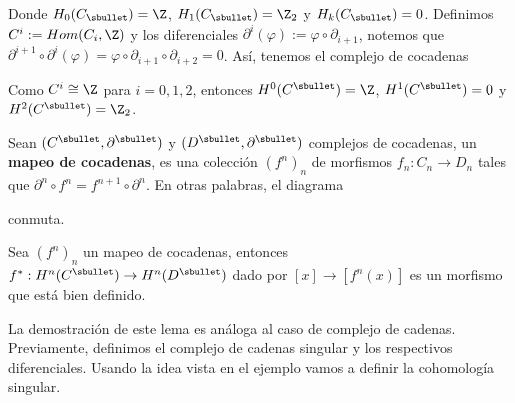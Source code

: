 \documentclass{article}
\begin{document}
\vspace{2mm}
\noindent Donde $H_{0}(C_{\sbullet})=\Z$, $H_{1}(C_{\sbullet})=\Z_{2}$ y $H_{k}(C_{\sbullet})=0$. 
Definimos $C^{i}:=Hom(C_{i},\Z)$ y los diferenciales $\partial^{i}(\varphi)
:=\varphi\circ\partial_{i+1}$, notemos que $\partial^{i+1}\circ\partial^{i}(\varphi)
=\varphi\circ\partial_{i+1}\circ\partial_{i+2}=0$. Así, tenemos el complejo de cocadenas

\vspace{2mm}
    \centerline{
    }

\vspace{2mm}
\noindent Como $C^{i}\cong\Z$ para $i=0,1,2$, entonces $H^{0}(C^{\sbullet})=\Z$, 
$H^{1}(C^{\sbullet})=0$ y $H^{2}(C^{\sbullet})=\Z_{2}$.

\vspace{2mm}
\begin{dfn}
    Sean $(C^{\sbullet},\partial^{\sbullet})$ y $(D^{\sbullet},\partial^{\sbullet})$ complejos de
    cocadenas, un \textbf{mapeo de cocadenas}, es una colección $(f^{n})_{n}$ de morfismos
    $f_{n}:C_{n}\to D_{n}$ tales que $\partial^{n}\circ f^{n}=f^{n+1}\circ\partial^{n}$. En otras
    palabras, el diagrama

    \vspace{2mm}
    \centerline{
    }
    \noindent conmuta.
\end{dfn}

\begin{lema}
    Sea $(f^{n})_{n}$ un mapeo de cocadenas, entonces $f^{*}:H^{n}(C^{\sbullet})\to 
    H^{n}(D^{\sbullet})$ dado por $[x]\to[f^{n}(x)]$ es un morfismo que está bien definido.
\end{lema}

\noindent La demostración de este lema es análoga al caso de complejo de cadenas. Previamente,
definimos el complejo de cadenas singular y los respectivos diferenciales. Usando la idea vista en
el ejemplo vamos a definir la cohomología singular.
\end{document}
